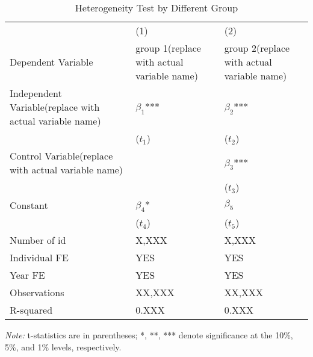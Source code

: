 \begin{table}[htbp]
\caption{Heterogeneity Test by Different Group}
\label{Use the regression name as the label}
\centering
\begin{tabular}{p{3.6cm}p{3.6cm}p{3.6cm}} %
\toprule
& (1) & (2) \\
Dependent Variable  & group 1(replace with actual variable name)  & group 2(replace with actual variable name)  \\
\midrule
Independent Variable(replace with actual variable name)   & $\beta_1$*** & $\beta_2$*** \\
            & ($t_1$) & ($t_2$) \\
Control Variable(replace with actual variable name)     &  & $\beta_3$*** \\  %
            &  & ($t_3$) \\
Constant    & $\beta_4$* & $\beta_5$ \\
            & ($t_4$) & ($t_5$) \\

Number of id       & X,XXX        & X,XXX \\
Individual FE      & YES          & YES \\
Year FE            & YES          & YES \\
Observations       & XX,XXX       & XX,XXX \\
R-squared          & 0.XXX        & 0.XXX \\
\bottomrule
\end{tabular}
\begin{tablenotes}
\small
\item \textit{Note:} t-statistics are in parentheses; *, **, *** denote significance at the 10\%, 5\%, and 1\% levels, respectively.
\end{tablenotes}
\end{table}


